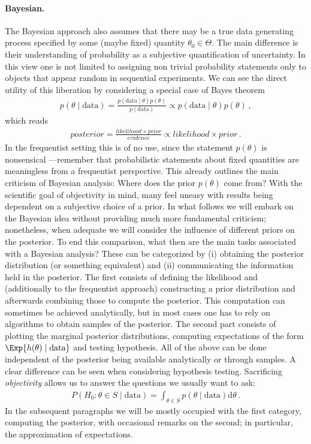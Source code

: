 \paragraph{Bayesian.} The Bayesian approach also assumes that there may be a true data generating process specified by some (maybe fixed) quantity $\theta_0 \in \Theta$.
The main difference is their understanding of probability as a subjective quantification of uncertainty.
In this view one is not limited to assigning non trivial probability statements only to objects that appear random in sequential experiments.
We can see the direct utility of this liberation by considering a special case of Bayes theorem
\begin{align}
  p(\theta \mid \text{data}) = \frac{p(\text{data} \mid \theta) p(\theta)}{p(\text{data})} \propto p(\text{data} \mid \theta) p(\theta) \,,
\end{align}
which reads
\begin{align}
  posterior = \frac{likelihood \times prior}{evidence} \propto likelihood \times prior \,.
\end{align}
In the frequentist setting this is of no use, since the statement $p(\theta)$ is nonsensical ---remember that probabilistic statements about fixed quantities are meaningless from a frequentist perspective.
This already outlines the main criticism of Bayesian analysis: Where does the prior $p(\theta)$ come from?
With the scientific goal of objectivity in mind, many feel uneasy with results being dependent on a subjective choice of a prior.
In what follows we will embark on the Bayesian idea without providing much more fundamental criticism; nonetheless, when adequate we will consider the influence of different priors on the posterior.
To end this comparison, what then are the main tasks associated with a Bayesian analysis?
These can be categorized by (i) obtaining the posterior distribution (or something equivalent) and (ii) communicating the information held in the posterior.
The first consists of defining the likelihood and (additionally to the frequentist approach) constructing a prior distribution and afterwards combining those to compute the posterior.
This computation can sometimes be achieved analytically, but in most cases one has to rely on algorithms to obtain samples of the posterior.
The second part consists of plotting the marginal posterior distributions, computing expectations of the form $\Exp{h(\theta) \mid \text{data}}$ and testing hypothesis.
All of the above can be done independent of the posterior being available analytically or through samples.
A clear difference can be seen when considering hypothesis testing.
Sacrificing \textit{objectivity} allows us to answer the questions we usually want to ask:
\begin{align}
  P(H_0: \theta \in S \mid \text{data}) = \int_{\theta \in S} p(\theta \mid \text{data}) \mathrm{d}\theta \,.
\end{align}
In the subsequent paragraphs we will be mostly occupied with the first category, computing the posterior, with occasional remarks on the second; in particular, the approximation of expectations.

